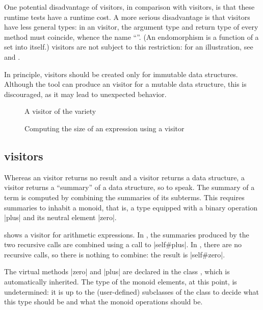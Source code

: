 \documentclass[11pt,a4paper,twoside]{article}
\begin{document}
One potential disadvantage of \mapendo visitors, in comparison with \map
visitors, is that these runtime tests have a runtime cost. A more serious
disadvantage is that \mapendo visitors have less general types: in an \mapendo
visitor, the argument type and return type of every method must coincide,
whence the name ``\mapendo''.
%
(An endomorphism is a function of a set into itself.)
%
\map visitors are not subject to this restriction: for an illustration, see
 and .

In principle, \mapendo visitors should be created only for immutable data
structures. Although the tool can produce an \mapendo visitor for a mutable
data structure, this is discouraged, as it may lead to unexpected behavior.


\begin{figure}[p]
\vspace{-\baselineskip}
\caption{A visitor of the \reduce variety}
\label{fig:expr15}
\end{figure}

\begin{figure}[t]
\caption{Computing the size of an expression using a \reduce visitor}
\label{fig:reduce}
\end{figure}

\subsection{\reduce visitors}
\label{sec:intro:reduce}

Whereas an \iter visitor returns no result and a \map visitor returns a data
structure, a \reduce visitor returns a ``summary'' of a data structure, so to
speak. The summary of a term is computed by combining the summaries of its
subterms. This requires summaries to inhabit a monoid, that is, a type
equipped with a binary operation \oc|plus| and its neutral element \oc|zero|.

 shows a \reduce visitor for arithmetic expressions. In
, the summaries produced by the two recursive calls are
combined using a call to \oc|self#plus|. In , there are
no recursive calls, so there is nothing to combine: the result is
\oc|self#zero|.

The virtual methods \oc|zero| and \oc|plus| are declared in the class
, which is automatically inherited. The type of the
monoid elements, at this point, is undetermined: it is up to the
(user-defined) subclasses of the class \reduce to decide what this type should
be and what the monoid operations should be.
\end{document}
